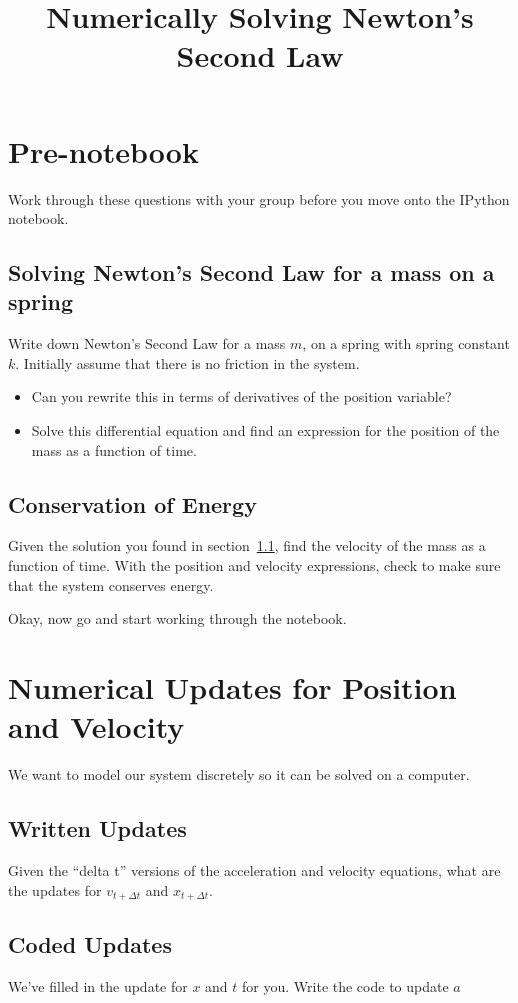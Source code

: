 \documentclass[11pt]{article}
\title{Numerically Solving Newton's Second Law}
\date{}
\begin{document}
\maketitle

\section{Pre-notebook}
Work through these questions with your group before you move onto the IPython notebook.

\subsection{Solving Newton's Second Law for a mass on a spring}\label{Newtons}
Write down Newton's Second Law for a mass $m$, on a spring with spring constant $k$.
Initially assume that there is no friction in the system.
\begin{itemize}
\item Can you rewrite this in terms of derivatives of the position variable?
\item Solve this differential equation and find an expression for the position of the mass as a function of time.
\end{itemize}

\subsection{Conservation of Energy}
Given the solution you found in section~\ref{Newtons}, find the velocity of the mass as a function of time.
With the position and velocity expressions, check to make sure that the system conserves energy.

Okay, now go and start working through the notebook.

\section{Numerical Updates for Position and Velocity}
We want to model our system discretely so it can be solved on a computer.
\subsection{Written Updates}
Given the ``delta t'' versions of the acceleration and velocity equations, what are the updates for $v_{t+\Delta t}$ and $x_{t+\Delta t}$.
\subsection{Coded Updates}
We've filled in the update for $x$ and $t$ for you. Write the code to update $a$
\end{document}
